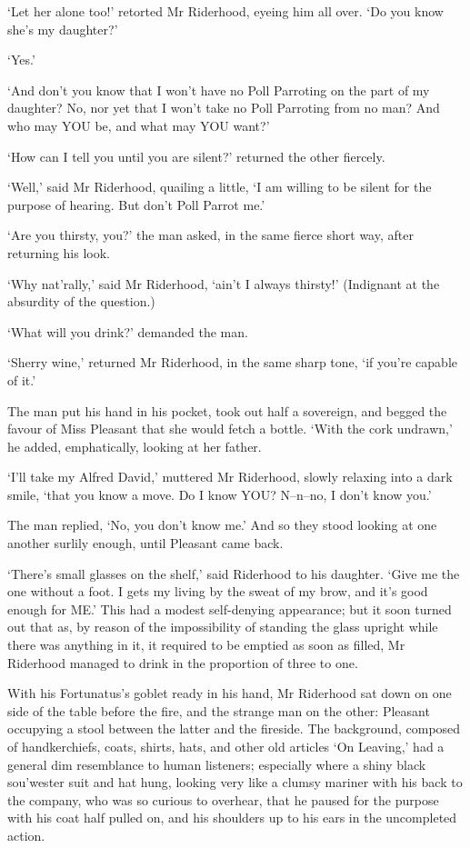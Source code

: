 ‘Let her alone too!’ retorted Mr Riderhood, eyeing him all over. ‘Do you
know she’s my daughter?’

‘Yes.’

‘And don’t you know that I won’t have no Poll Parroting on the part of
my daughter? No, nor yet that I won’t take no Poll Parroting from no
man? And who may YOU be, and what may YOU want?’

‘How can I tell you until you are silent?’ returned the other fiercely.

‘Well,’ said Mr Riderhood, quailing a little, ‘I am willing to be silent
for the purpose of hearing. But don’t Poll Parrot me.’

‘Are you thirsty, you?’ the man asked, in the same fierce short way,
after returning his look.

‘Why nat’rally,’ said Mr Riderhood, ‘ain’t I always thirsty!’ (Indignant
at the absurdity of the question.)

‘What will you drink?’ demanded the man.

‘Sherry wine,’ returned Mr Riderhood, in the same sharp tone, ‘if you’re
capable of it.’

The man put his hand in his pocket, took out half a sovereign, and
begged the favour of Miss Pleasant that she would fetch a bottle. ‘With
the cork undrawn,’ he added, emphatically, looking at her father.

‘I’ll take my Alfred David,’ muttered Mr Riderhood, slowly relaxing into
a dark smile, ‘that you know a move. Do I know YOU? N--n--no, I don’t
know you.’

The man replied, ‘No, you don’t know me.’ And so they stood looking at
one another surlily enough, until Pleasant came back.

‘There’s small glasses on the shelf,’ said Riderhood to his daughter.
‘Give me the one without a foot. I gets my living by the sweat of my
brow, and it’s good enough for ME.’ This had a modest self-denying
appearance; but it soon turned out that as, by reason of the
impossibility of standing the glass upright while there was anything in
it, it required to be emptied as soon as filled, Mr Riderhood managed to
drink in the proportion of three to one.

With his Fortunatus’s goblet ready in his hand, Mr Riderhood sat down on
one side of the table before the fire, and the strange man on the other:
Pleasant occupying a stool between the latter and the fireside. The
background, composed of handkerchiefs, coats, shirts, hats, and other
old articles ‘On Leaving,’ had a general dim resemblance to human
listeners; especially where a shiny black sou’wester suit and hat hung,
looking very like a clumsy mariner with his back to the company, who
was so curious to overhear, that he paused for the purpose with his
coat half pulled on, and his shoulders up to his ears in the uncompleted
action.

